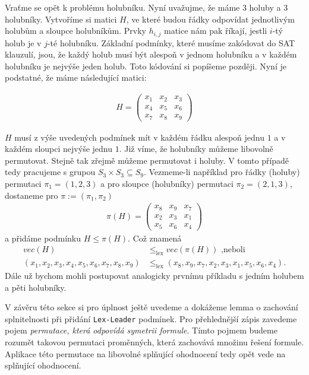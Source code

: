 \begin{prikl}
Vraťme se opět k problému holubníku. Nyní uvažujme, že máme 3 holuby a 3 holubníky. Vytvoříme si matici $H$, ve které budou řádky odpovídat jednotlivým holubům a sloupce holubníkům. Prvky $h_{i,j}$ matice nám pak říkají, jestli $i$-tý holub je v $j$-té holubníku. Základní podmínky, které musíme zakódovat do SAT klauzulí, jsou, že každý holub musí být alespoň v jednom holubníku a v každém holubníku je nejvýše jeden holub. Toto kódování si popíšeme později. Nyní je podstatné, že máme následující matici:

\begin{align*}
H =  \begin{pmatrix}
x_1 & x_2 & x_3 \\
x_4 & x_5 & x_6 \\
x_7 & x_8 & x_9 
\end{pmatrix}
\end{align*}

$H$ musí z výše uvedených podmínek mít v každém řádku alespoň jednu $1$ a v každém sloupci nejvýše jednu $1$. Již víme, že holubníky můžeme libovolně permutovat. Stejně tak zřejmě můžeme permutovat i holuby. V tomto případě tedy pracujeme s grupou $S_3 \times S_3 \subseteq S_9$. Vezmeme-li například pro řádky (holuby) permutaci $\pi_1 = (1,2,3)$ a pro sloupce (holubníky) permutaci $\pi_2 = (2,1,3)$, dostaneme pro $\pi := (\pi_1, \pi_2)$
\begin{align*}
\pi(H) =  \begin{pmatrix}
x_8 & x_9 & x_7 \\
x_2 & x_3 & x_1 \\
x_5 & x_6 & x_4 
\end{pmatrix}
\end{align*}
a přidáme podmínku $H \leq \pi(H)$. Což znamená 
\begin{align*}
vec(H) &\leq_{\text{lex}} vec(\pi(H)) \text{ ,neboli}\\
(x_1, x_2, x_3, x_4, x_5, x_6, x_7, x_8, x_9) &\leq_{\text{lex}} (x_8, x_9, x_7, x_2, x_3, x_1, x_5, x_6, x_4).
\end{align*}
Dále už bychom mohli postupovat analogicky prvnímu příkladu s jedním holubem a pěti holubníky.
\end{prikl}

V závěru této sekce si pro úplnost ještě uvedeme a dokážeme lemma o zachování splnitelnosti při přidání \texttt{Lex-Leader} podmínek. Pro přehlednější zápis zavedeme pojem \textit{permutace, která odpovídá symetrii formule}. Tímto pojmem budeme rozumět takovou permutaci proměnných, která zachovává množinu řešení formule. Aplikace této permutace na libovolné splňující ohodnocení tedy opět vede na splňující ohodnocení.

